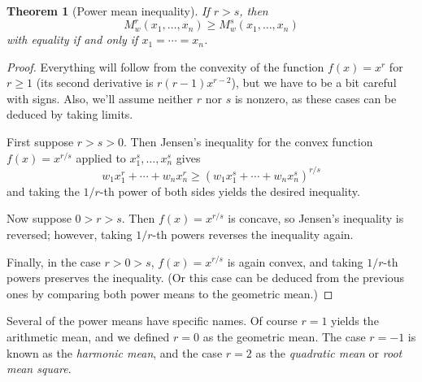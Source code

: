\documentclass[12pt]{report}
\newtheorem{theorem}{Theorem}
\numberwithin{exc}{section}
\begin{document}
\begin{theorem}[Power mean inequality]
If $r > s$, then
\[
M^{r}_{w}(x_{1}, \dots, x_{n}) \geq M^{s}_{w}(x_{1}, \dots, x_{n})
\]
with equality if and only if $x_{1} = \cdots = x_{n}$.
\end{theorem}
\begin{proof}
Everything will follow from the convexity of the function $f(x) = 
x^{r}$ for $r \geq 1$ (its second derivative is $r(r-1)x^{r-2}$), but 
we have to be a bit careful with signs. Also, we'll assume neither 
$r$ nor $s$ is nonzero, as these cases can be deduced by taking limits.

First suppose $r >s > 0$. Then 
Jensen's inequality for the convex function $f(x) = x^{r/s}$ applied to 
$x_{1}^{s}, \dots, x_{n}^{s}$ gives
\[
w_{1} x_{1}^{r} + \cdots + w_{n} x_{n}^{r} \geq
\left( w_{1} x_{1}^{s} + \cdots + w_{n} x_{n}^{s} \right)^{r/s}
\]
and taking the $1/r$-th power of both sides yields the desired 
inequality.

Now suppose $0 > r > s$. Then $f(x) = x^{r/s}$ is concave, so Jensen's 
inequality is reversed; however, taking $1/r$-th powers reverses the 
inequality again.

Finally, in the case $r > 0 > s$, $f(x) = x^{r/s}$ is again convex, 
and taking $1/r$-th powers preserves the inequality. (Or this case can 
be deduced from the previous ones by comparing both power means to the 
geometric mean.)
\end{proof}

Several of the power means have specific names. Of course $r=1$ yields 
the arithmetic mean, and we defined $r=0$ as the geometric mean. The 
case $r=-1$ is known as the \emph{harmonic mean}, and the case $r=2$ 
as the \emph{quadratic mean} or \emph{root mean square}.
%
\end{document}
